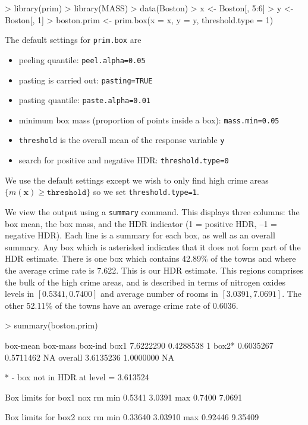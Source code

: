 \documentclass[a4paper,11pt]{article}
\renewcommand{\vec}[1]{\boldsymbol{#1}}
\def\vecx{\vec{x}}
\begin{document}
\begin{Schunk}
\begin{Sinput}
> library(prim)
> library(MASS)
> data(Boston)
> x <- Boston[, 5:6]
> y <- Boston[, 1]
> boston.prim <- prim.box(x = x, y = y, threshold.type = 1)
\end{Sinput}
\end{Schunk}
The default settings for \texttt{prim.box} are
\begin{itemize}
\item peeling quantile: \texttt{peel.alpha=0.05}
\item pasting is carried out: \texttt{pasting=TRUE} 
\item pasting quantile: \texttt{paste.alpha=0.01}
\item minimum box mass (proportion of points inside a box): 
 \texttt{mass.min=0.05} 
\item \texttt{threshold} is the overall mean of the response variable \texttt{y}
\item search for positive and negative HDR: \texttt{threshold.type=0}
\end{itemize}
We use the default settings except we wish to only find high crime areas 
$\lbrace m(\vecx) \geq \texttt{threshold} \rbrace$
so we set \texttt{threshold.type=1}. 

We view the output using a \texttt{summary} command. This displays three
columns: the box mean, the box mass, and the HDR indicator 
(1 = positive HDR, --1 = negative HDR). Each line is a summary
for each box, as well as an overall summary. Any box which is asterisked
indicates that it does not form part of the HDR estimate.
There is one box which contains 42.89\% of the towns
and where the average crime rate is 7.622. This is our HDR estimate. 
This regions comprises the bulk
of the high crime areas, and is described in terms of 
nitrogen oxides levels in $[0.5341, 0.7400]$ 
and average number of rooms in $[3.0391, 7.0691]$.
The other 52.11\% of the
towns have an average crime rate of 0.6036.

\begin{Schunk}
\begin{Sinput}
> summary(boston.prim)
\end{Sinput}
\begin{Soutput}
         box-mean  box-mass box-ind
box1    7.6222290 0.4288538       1
box2*   0.6035267 0.5711462      NA
overall 3.6135236 1.0000000      NA

* - box not in HDR at level = 3.613524 

Box limits for box1
       nox     rm
min 0.5341 3.0391
max 0.7400 7.0691

Box limits for box2
        nox      rm
min 0.33640 3.03910
max 0.92446 9.35409
\end{Soutput}
\end{Schunk}
\end{document}
